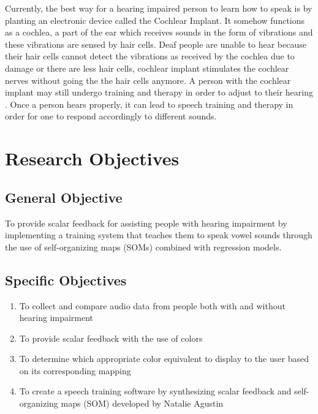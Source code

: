 Currently, the best way for a hearing impaired person to learn how to speak is by planting an electronic device called the Cochlear Implant. It somehow functions as a cochlea, a part of the ear which receives sounds in the form of vibrations and these vibrations are sensed by hair cells. Deaf people are unable to hear because their hair cells cannot detect the vibrations as received by the cochlea due to damage or there are less hair cells, cochlear implant stimulates the cochlear nerves without going the the hair cells anymore. A person with the cochlear implant may still undergo training and therapy in order to adjust to their hearing \cite{blume:2009:AE}. Once a person hears properly, it can lead to speech training and therapy in order for one to respond accordingly to different sounds.

\section{Research Objectives}
\label{sec:researchobjectives}

\subsection{General Objective}
\label{sec:generalobjective}

To provide scalar feedback for assisting people with hearing impairment by implementing a training system that teaches them to speak vowel sounds through the use of self-organizing maps (SOMs) combined with regression models.

\subsection{Specific Objectives}
\label{sec:specificobjectives}

\begin{enumerate}
\item To collect and compare audio data from people both with and without hearing impairment
\item To provide scalar feedback with the use of colors
\item To determine which appropriate color equivalent to display to the user based on its corresponding mapping
\item To create a speech training software by synthesizing scalar feedback and self-organizing maps (SOM) developed by Natalie Agustin \citeyear{agustin:2014:SOM}
\end{enumerate}

